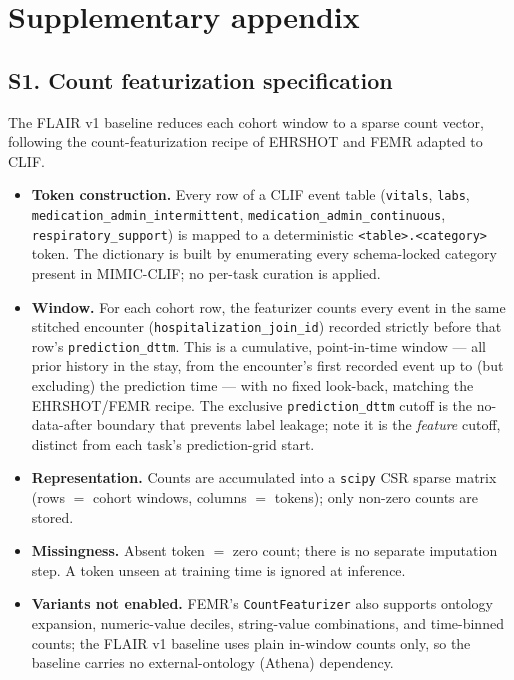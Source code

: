 \section{Supplementary appendix}
\label{sec:supp}

\subsection*{S1. Count featurization specification}

The FLAIR v1 baseline reduces each cohort window to a sparse count
vector, following the count-featurization recipe of EHRSHOT and FEMR
\citep{wornow2023ehrshot,steinberg2021femr} adapted to CLIF.

\begin{itemize}[leftmargin=1.5em]
  \item \textbf{Token construction.} Every row of a CLIF event table
        (\texttt{vitals}, \texttt{labs},
        \texttt{medication\_admin\_intermittent},
        \texttt{medication\_admin\_continuous},
        \texttt{respiratory\_support}) is mapped to a deterministic
        \texttt{<table>.<category>} token. The dictionary is built by
        enumerating every schema-locked category present in MIMIC-CLIF;
        no per-task curation is applied.
  \item \textbf{Window.} For each cohort row, the featurizer counts
        every event in the same stitched encounter
        (\texttt{hospitalization\_join\_id}) recorded strictly before
        that row's \texttt{prediction\_dttm}. This is a cumulative,
        point-in-time window --- all prior history in the stay, from the
        encounter's first recorded event up to (but excluding) the
        prediction time --- with no fixed look-back, matching the
        EHRSHOT/FEMR recipe. The exclusive \texttt{prediction\_dttm}
        cutoff is the no-data-after boundary that prevents label
        leakage; note it is the \emph{feature} cutoff, distinct from
        each task's prediction-grid start.
  \item \textbf{Representation.} Counts are accumulated into a
        \texttt{scipy} CSR sparse matrix (rows $=$ cohort windows,
        columns $=$ tokens); only non-zero counts are stored.
  \item \textbf{Missingness.} Absent token $=$ zero count; there is no
        separate imputation step. A token unseen at training time is
        ignored at inference.
  \item \textbf{Variants not enabled.} FEMR's \texttt{CountFeaturizer}
        also supports ontology expansion, numeric-value deciles,
        string-value combinations, and time-binned counts; the FLAIR
        v1 baseline uses plain in-window counts only, so the baseline
        carries no external-ontology (Athena) dependency.
\end{itemize}


